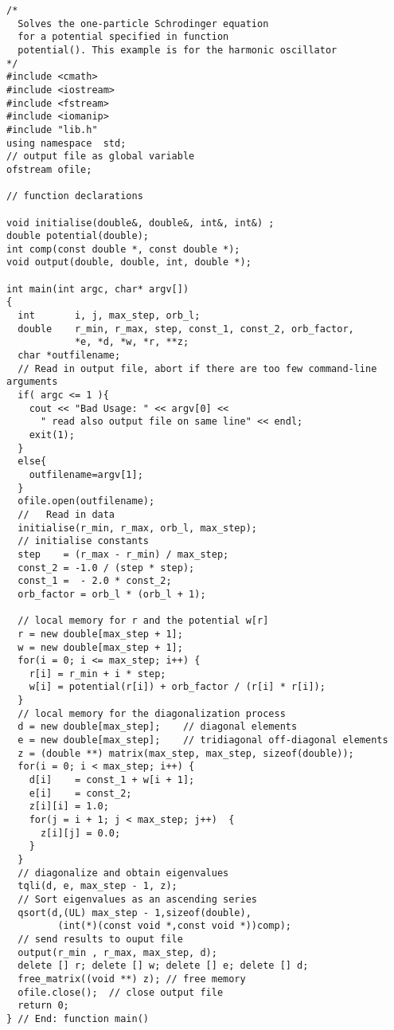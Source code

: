 \begin{lstlisting}[title={\url{http://folk.uio.no/compphys/programs/chapter07/cpp/program1.cpp}}]
/*
  Solves the one-particle Schrodinger equation
  for a potential specified in function
  potential(). This example is for the harmonic oscillator
*/
#include <cmath>
#include <iostream>
#include <fstream>
#include <iomanip>
#include "lib.h"
using namespace  std;
// output file as global variable
ofstream ofile;  

// function declarations 

void initialise(double&, double&, int&, int&) ;
double potential(double);
int comp(const double *, const double *);
void output(double, double, int, double *);

int main(int argc, char* argv[])
{
  int       i, j, max_step, orb_l;
  double    r_min, r_max, step, const_1, const_2, orb_factor, 
            *e, *d, *w, *r, **z;
  char *outfilename;
  // Read in output file, abort if there are too few command-line arguments
  if( argc <= 1 ){
    cout << "Bad Usage: " << argv[0] << 
      " read also output file on same line" << endl;
    exit(1);
  }
  else{
    outfilename=argv[1];
  }
  ofile.open(outfilename); 
  //   Read in data 
  initialise(r_min, r_max, orb_l, max_step);
  // initialise constants
  step    = (r_max - r_min) / max_step; 
  const_2 = -1.0 / (step * step);
  const_1 =  - 2.0 * const_2;
  orb_factor = orb_l * (orb_l + 1);
  
  // local memory for r and the potential w[r] 
  r = new double[max_step + 1];
  w = new double[max_step + 1];
  for(i = 0; i <= max_step; i++) {
    r[i] = r_min + i * step;
    w[i] = potential(r[i]) + orb_factor / (r[i] * r[i]);
  }
  // local memory for the diagonalization process 
  d = new double[max_step];    // diagonal elements 
  e = new double[max_step];    // tridiagonal off-diagonal elements 
  z = (double **) matrix(max_step, max_step, sizeof(double));
  for(i = 0; i < max_step; i++) {
    d[i]    = const_1 + w[i + 1];
    e[i]    = const_2;
    z[i][i] = 1.0;
    for(j = i + 1; j < max_step; j++)  {
      z[i][j] = 0.0;
    }
  }
  // diagonalize and obtain eigenvalues
  tqli(d, e, max_step - 1, z);      
  // Sort eigenvalues as an ascending series 
  qsort(d,(UL) max_step - 1,sizeof(double),
         (int(*)(const void *,const void *))comp);
  // send results to ouput file
  output(r_min , r_max, max_step, d);
  delete [] r; delete [] w; delete [] e; delete [] d; 
  free_matrix((void **) z); // free memory
  ofile.close();  // close output file
  return 0;
} // End: function main() 


\end{lstlisting}
